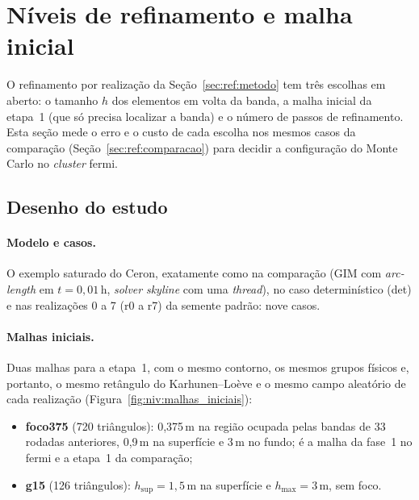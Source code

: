 
\section{Níveis de refinamento e malha inicial}\label{sec:ref:niveis}

O refinamento por realização da Seção~\ref{sec:ref:metodo} tem três escolhas em aberto: o tamanho $h$ dos elementos em
volta da banda, a malha inicial da etapa~1 (que só precisa localizar a banda) e o número de passos de refinamento.
Esta seção mede o erro e o custo de cada escolha nos mesmos casos da comparação
(Seção~\ref{sec:ref:comparacao}) para decidir a configuração do Monte Carlo no \emph{cluster} fermi.

\subsection{Desenho do estudo}\label{sec:ref:niveis:desenho}

\paragraph{Modelo e casos.} O exemplo saturado do Ceron, exatamente como na comparação (GIM com
\emph{arc-length} em $t = 0{,}01$\,h, \emph{solver} \emph{skyline} com uma \emph{thread}), no caso determinístico
(det) e nas realizações 0 a 7 (r0 a r7) da semente padrão: nove casos.

\paragraph{Malhas iniciais.} Duas malhas para a etapa~1, com o mesmo contorno, os mesmos grupos físicos e, portanto, o
mesmo retângulo do Karhunen--Loève e o mesmo campo aleatório de cada realização
(Figura~\ref{fig:niv:malhas_iniciais}):
\begin{itemize}
  \item \textbf{foco375} (720 triângulos): 0,375\,m na região ocupada pelas bandas de 33 rodadas anteriores, 0,9\,m na
        superfície e 3\,m no fundo; é a malha da fase~1 no fermi e a etapa~1 da comparação;
  \item \textbf{g15} (126 triângulos): $h_\text{sup} = 1{,}5$\,m na superfície e $h_\text{max} = 3$\,m, sem foco.
\end{itemize}

